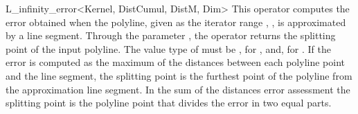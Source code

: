 \begin{ccRefClass}{L_infinity_error<Kernel, DistCumul, DistM, Dim>}
{This operator computes the error obtained when the polyline, given as the iterator range , ,
is approximated by a line segment. Through the parameter , the operator returns the 
splitting point of the input polyline.  The value type of  must be , for ,
and, for .
If the error is computed as the maximum of the distances between each
polyline point and the line segment, the splitting point is the furthest
point of the polyline from the approximation line segment. In the sum of
the distances error assessment the splitting point is the polyline point
that divides the error in two equal parts. }


\ccSeeAlso


\end{ccRefClass}

